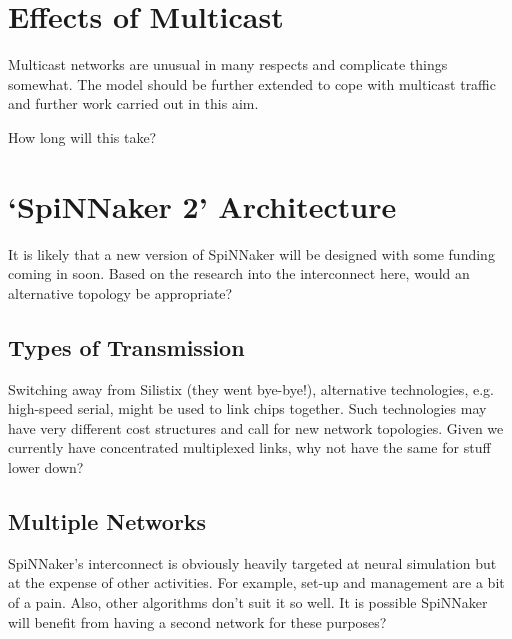 	
	\section{Effects of Multicast}
		
		Multicast networks are unusual in many respects and complicate things
		somewhat. The model should be further extended to cope with multicast
		traffic and further work carried out in this aim.
		
		How long will this take?
	
	\section{`SpiNNaker 2' Architecture}
		
		It is likely that a new version of SpiNNaker will be designed with some
		funding coming in soon. Based on the research into the interconnect here,
		would an alternative topology be appropriate?
		
		\subsection{Types of Transmission}
			
			Switching away from Silistix (they went bye-bye!), alternative
			technologies, e.g. high-speed serial, might be used to link chips
			together. Such technologies may have very different cost structures and
			call for new network topologies. Given we currently have concentrated
			multiplexed links, why not have the same for stuff lower down?
		
		\subsection{Multiple Networks}
			
			SpiNNaker's interconnect is obviously heavily targeted at neural
			simulation but at the expense of other activities. For example, set-up and
			management are a bit of a pain. Also, other algorithms don't suit it so
			well. It is possible SpiNNaker will benefit from having a second network
			for these purposes?

